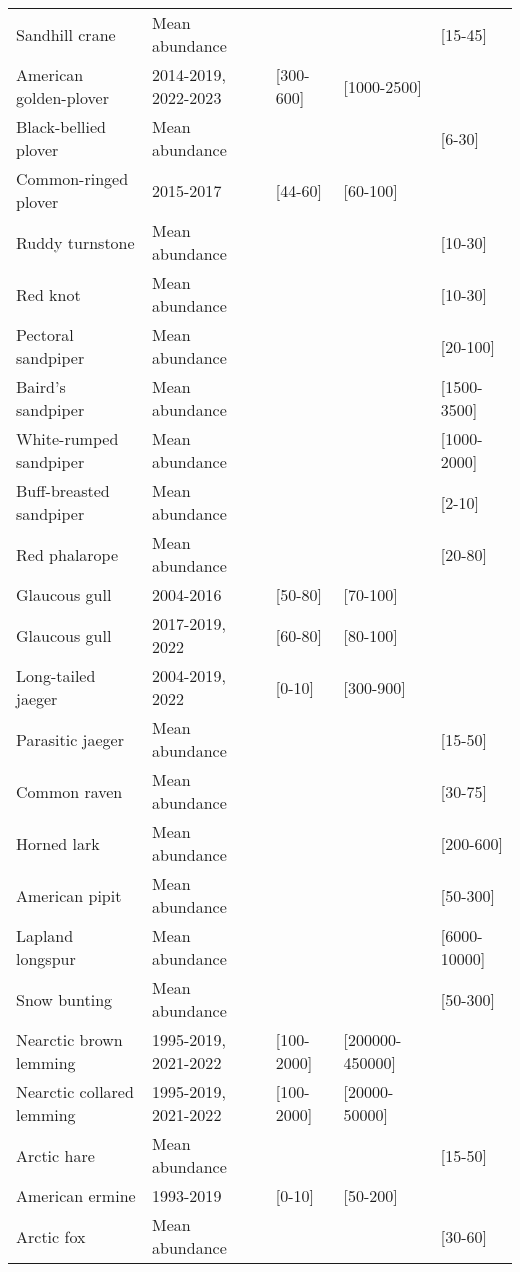 \begin{table}[ht]
\begin{tabularx}{\textwidth}{lllll}
  Sandhill crane & Mean abundance &  &  & [15-45] \\ 
  American golden-plover & 2014-2019, 2022-2023 & [300-600] & [1000-2500] &  \\ 
  Black-bellied plover & Mean abundance &  &  & [6-30] \\ 
  Common-ringed plover & 2015-2017 & [44-60] & [60-100] &  \\ 
  Ruddy turnstone & Mean abundance &  &  & [10-30] \\ 
  Red knot & Mean abundance &  &  & [10-30] \\ 
  Pectoral sandpiper & Mean abundance &  &  & [20-100] \\ 
  Baird's sandpiper & Mean abundance &  &  & [1500-3500] \\ 
  White-rumped sandpiper & Mean abundance &  &  & [1000-2000] \\ 
  Buff-breasted sandpiper & Mean abundance &  &  & [2-10] \\ 
  Red phalarope & Mean abundance &  &  & [20-80] \\ 
  Glaucous gull & 2004-2016 & [50-80] & [70-100] &  \\ 
  Glaucous gull & 2017-2019, 2022 & [60-80] & [80-100] &  \\ 
  Long-tailed jaeger & 2004-2019, 2022 & [0-10] & [300-900] &  \\ 
  Parasitic jaeger & Mean abundance &  &  & [15-50] \\ 
  Common raven & Mean abundance &  &  & [30-75] \\ 
  Horned lark & Mean abundance &  &  & [200-600] \\ 
  American pipit & Mean abundance &  &  & [50-300] \\ 
  Lapland longspur & Mean abundance &  &  & [6000-10000] \\ 
  Snow bunting & Mean abundance &  &  & [50-300] \\ 
  Nearctic brown lemming & 1995-2019, 2021-2022 & [100-2000] & [200000-450000] &  \\ 
  Nearctic collared lemming & 1995-2019, 2021-2022 & [100-2000] & [20000-50000] &  \\ 
  Arctic hare & Mean abundance &  &  & [15-50] \\ 
  American ermine & 1993-2019 & [0-10] & [50-200] &  \\ 
  Arctic fox & Mean abundance &  &  & [30-60] \\ 
   \hline
\end{tabularx}
\endgroup
\end{table}
